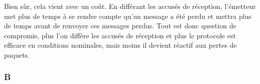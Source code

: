 Bien sûr, cela vient avec un coût. En différant les accusés de réception, l'émetteur met plus de temps à se rendre compte qu'un message a été perdu et mettra plus de temps avant de renvoyer ces messages perdus. Tout est donc question de compromis, plus l'on diffère les accusés de réception et plus le protocole est efficace en conditions nominales, mais moins il devient réactif aux pertes de paquets.

\subsubsection{B}

    \lipsum[1-2]